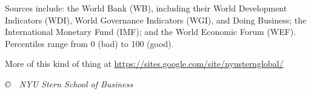 \documentclass[12pt]{article}
\begin{document}
%
\vspace{-0.15in}
Sources include:  the World Bank (WB),
including their World Development Indicators (WDI),
World Governance Indicators (WGI), and Doing Business;
the International Monetary Fund (IMF);
and the World Economic Forum (WEF).
Percentiles range from 0 (bad) to 100 (good).

\vfill
{
More of this kind of thing at \url{https://sites.google.com/site/nyusternglobal/}

\vspace*{0.25in}
\centerline{\it \copyright \ \number\year \
NYU Stern School of Business}
}
\end{document}
